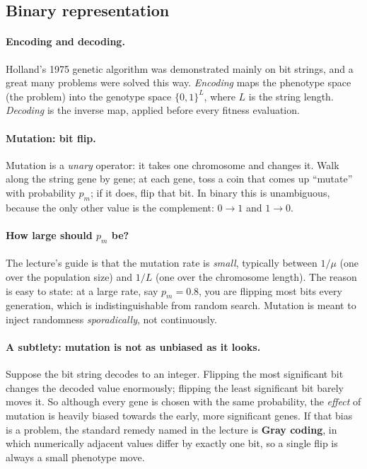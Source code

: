 \documentclass[11pt,a4paper]{article}
\begin{document}
\subsection{Binary representation}

\paragraph{Encoding and decoding.}
Holland's 1975 genetic algorithm was demonstrated mainly on bit strings, and
a great many problems were solved this way. \emph{Encoding} maps the
phenotype space (the problem) into the genotype space $\{0,1\}^L$, where $L$
is the string length. \emph{Decoding} is the inverse map, applied before
every fitness evaluation.

\paragraph{Mutation: bit flip.}
Mutation is a \emph{unary} operator: it takes one chromosome and changes it.
Walk along the string gene by gene; at each gene, toss a coin that comes up
``mutate'' with probability $p_m$; if it does, flip that bit. In binary this
is unambiguous, because the only other value is the complement: $0\to1$ and
$1\to0$.

\paragraph{How large should $p_m$ be?}
The lecture's guide is that the mutation rate is \emph{small}, typically
between $1/\mu$ (one over the population size) and $1/L$ (one over the
chromosome length). The reason is easy to state: at a large rate, say
$p_m=0.8$, you are flipping most bits every generation, which is
indistinguishable from random search. Mutation is meant to inject randomness
\emph{sporadically}, not continuously.

\paragraph{A subtlety: mutation is not as unbiased as it looks.}
Suppose the bit string decodes to an integer. Flipping the most significant
bit changes the decoded value enormously; flipping the least significant bit
barely moves it. So although every gene is chosen with the same probability,
the \emph{effect} of mutation is heavily biased towards the early, more
significant genes. If that bias is a problem, the standard remedy named in
the lecture is \textbf{Gray coding}, in which numerically adjacent values
differ by exactly one bit, so a single flip is always a small phenotype move.
\end{document}
